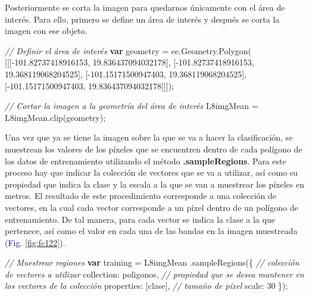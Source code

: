\documentclass[
  12pt,
  letterpaper,
  twoside]{book}
\newenvironment{Shaded}{\begin{snugshade}}{\end{snugshade}}
\newcommand{\AttributeTok}[1]{\textcolor[rgb]{0.48,0.12,0.64}{#1}}
\newcommand{\CommentTok}[1]{\textcolor[rgb]{0.24,0.58,0.00}{\textit{#1}}}
\newcommand{\DataTypeTok}[1]{\textcolor[rgb]{0.00,0.00,0.00}{#1}}
\newcommand{\DecValTok}[1]{\textcolor[rgb]{0.28,0.53,0.93}{#1}}
\newcommand{\FloatTok}[1]{\textcolor[rgb]{0.28,0.53,0.93}{#1}}
\newcommand{\FunctionTok}[1]{\textcolor[rgb]{0.48,0.12,0.64}{#1}}
\newcommand{\KeywordTok}[1]{\textcolor[rgb]{0.00,0.00,0.00}{\textbf{#1}}}
\newcommand{\NormalTok}[1]{#1}
\newcommand{\OperatorTok}[1]{\textcolor[rgb]{0.00,0.00,0.00}{#1}}
\newcommand{\StringTok}[1]{\textcolor[rgb]{0.87,0.29,0.22}{#1}}
\newcommand\boldpurple[1]{\textcolor{darkpurple}{\textbf{#1}}}
\begin{document}
Posteriormente se corta la imagen para quedarnos únicamente con el área de interés. Para ello, primero se define un área de interés y después se corta la imagen con ese objeto.

\begin{Shaded}
\begin{Highlighting}[]
\CommentTok{// Definir el área de interés}
\KeywordTok{var}\NormalTok{ geometry }\OperatorTok{=}\NormalTok{ ee}\OperatorTok{.}\AttributeTok{Geometry}\OperatorTok{.}\FunctionTok{Polygon}\NormalTok{(}
\NormalTok{        [[[}\OperatorTok{{-}}\FloatTok{101.82737418916153}\OperatorTok{,} \FloatTok{19.836437094032178}\NormalTok{]}\OperatorTok{,}
\NormalTok{          [}\OperatorTok{{-}}\FloatTok{101.82737418916153}\OperatorTok{,} \FloatTok{19.368119068204525}\NormalTok{]}\OperatorTok{,}
\NormalTok{          [}\OperatorTok{{-}}\FloatTok{101.15171500947403}\OperatorTok{,} \FloatTok{19.368119068204525}\NormalTok{]}\OperatorTok{,}
\NormalTok{          [}\OperatorTok{{-}}\FloatTok{101.15171500947403}\OperatorTok{,} \FloatTok{19.836437094032178}\NormalTok{]]])}\OperatorTok{;}
          
\CommentTok{// Cortar la imagen a la geometría del área de interés}
\NormalTok{L8imgMean }\OperatorTok{=}\NormalTok{ L8imgMean}\OperatorTok{.}\FunctionTok{clip}\NormalTok{(geometry)}\OperatorTok{;}
\end{Highlighting}
\end{Shaded}

Una vez que ya se tiene la imagen sobre la que se va a hacer la clasificación, se muestrean los valores de los píxeles que se encuentren dentro de cada polígono de los datos de entrenamiento utilizando el método \boldpurple{.sampleRegions}. Para este proceso hay que indicar la colección de vectores que se va a utilizar, así como su propiedad que indica la clase y la escala a la que se van a muestrear los píxeles en metros. El resultado de este procedimiento corresponde a una colección de vectores, en la cual cada vector corresponde a un píxel dentro de un polígono de entrenamiento. De tal manera, para cada vector se indica la clase a la que pertenece, así como el valor en cada una de las bandas en la imagen muestreada (\textcolor{darkblue}{Fig.} \ref{fig:fc122}).

\begin{Shaded}
\begin{Highlighting}[]
\CommentTok{// Muestrear regiones }
\KeywordTok{var}\NormalTok{ training }\OperatorTok{=}\NormalTok{ L8imgMean}
  \OperatorTok{.}\FunctionTok{sampleRegions}\NormalTok{(\{}
    \CommentTok{// colección de vectores a utilizar}
    \DataTypeTok{collection}\OperatorTok{:}\NormalTok{ poligonos}\OperatorTok{,}
    \CommentTok{// propiedad que se desea mantener en los vectores de la colección}
    \DataTypeTok{properties}\OperatorTok{:}\NormalTok{ [}\StringTok{\textquotesingle{}clase\textquotesingle{}}\NormalTok{]}\OperatorTok{,}
    \CommentTok{// tamaño de píxel}
    \DataTypeTok{scale}\OperatorTok{:} \DecValTok{30}
\NormalTok{  \})}\OperatorTok{;}
\end{Highlighting}
\end{Shaded}
\end{document}
